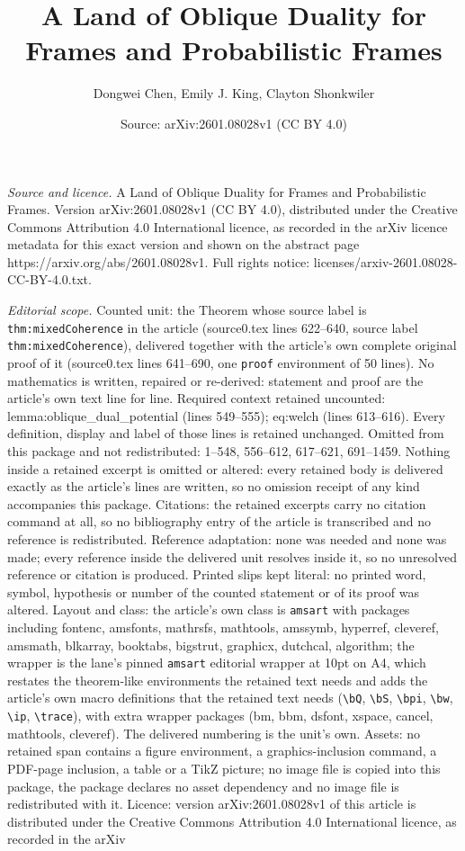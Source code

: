 \documentclass[10pt,a4paper]{amsart}
\title[A Land of Oblique Duality for Frames and Probabilistic Frame]{A Land of Oblique Duality for Frames and Probabilistic Frames}
\author{Dongwei Chen, Emily J. King, Clayton Shonkwiler}
\date{Source: arXiv:2601.08028v1 (CC BY 4.0)}
\begin{document}
\maketitle

\noindent\emph{Source and licence.} A Land of Oblique Duality for Frames and Probabilistic Frames. Version arXiv:2601.08028v1 (CC BY 4.0), distributed under the Creative Commons Attribution 4.0 International licence, as recorded in the arXiv licence metadata for this exact version and shown on the abstract page https://arxiv.org/abs/2601.08028v1. Full rights notice: licenses/arxiv-2601.08028-CC-BY-4.0.txt.\par\smallskip

\noindent\textit{Editorial scope.} Counted unit: the Theorem whose source label is \texttt{thm:mixedCoherence} in the article (source0.tex lines 622--640, source label \texttt{thm:mixedCoherence}), delivered together with the article's own complete original proof of it (source0.tex lines 641--690, one \texttt{proof} environment of 50 lines). No mathematics is written, repaired or re-derived: statement and proof are the article's own text line for line. Required context retained uncounted: lemma:oblique\_dual\_potential (lines 549--555); eq:welch (lines 613--616). Every definition, display and label of those lines is retained unchanged. Omitted from this package and not redistributed: 1--548, 556--612, 617--621, 691--1459. Nothing inside a retained excerpt is omitted or altered: every retained body is delivered exactly as the article's lines are written, so no omission receipt of any kind accompanies this package. Citations: the retained excerpts carry no citation command at all, so no bibliography entry of the article is transcribed and no reference is redistributed. Reference adaptation: none was needed and none was made; every reference inside the delivered unit resolves inside it, so no unresolved reference or citation is produced. Printed slips kept literal: no printed word, symbol, hypothesis or number of the counted statement or of its proof was altered. Layout and class: the article's own class is \texttt{amsart} with packages including fontenc, amsfonts, mathrsfs, mathtools, amssymb, hyperref, cleveref, amsmath, blkarray, booktabs, bigstrut, graphicx, dutchcal, algorithm; the wrapper is the lane's pinned \texttt{amsart} editorial wrapper at 10pt on A4, which restates the theorem-like environments the retained text needs and adds the article's own macro definitions that the retained text needs (\texttt{\textbackslash bQ}, \texttt{\textbackslash bS}, \texttt{\textbackslash bpi}, \texttt{\textbackslash bw}, \texttt{\textbackslash ip}, \texttt{\textbackslash trace}), with extra wrapper packages (bm, bbm, dsfont, xspace, cancel, mathtools, cleveref). The delivered numbering is the unit's own. Assets: no retained span contains a figure environment, a graphics-inclusion command, a PDF-page inclusion, a table or a TikZ picture; no image file is copied into this package, the package declares no asset dependency and no image file is redistributed with it. Licence: version arXiv:2601.08028v1 of this article is distributed under the Creative Commons Attribution 4.0 International licence, as recorded in the arXiv 
\end{document}
